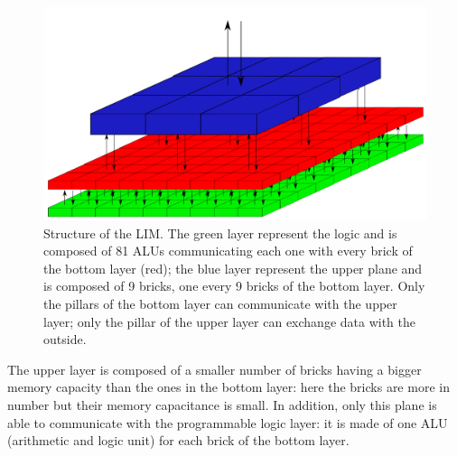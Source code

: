 \begin{figure}[h!]
	\centering
	\includegraphics[width=\textwidth]{imm/iia/B.png}  
	\caption{ Structure of the LIM. The green layer represent the logic and is composed of 81 ALUs communicating each one with every brick of the bottom layer (red); the blue layer represent the upper plane and is composed of 9 bricks, one every 9 bricks of the bottom layer. Only the pillars of the bottom layer can communicate with the upper layer; only the pillar of the upper layer can exchange data with the outside.
	} 
	\label{fig:B}
\end{figure}
The upper layer is composed of a smaller number of bricks having a bigger memory capacity than the ones in the bottom layer: here the bricks are more in number but their memory capacitance is small. In addition, only this plane is able to communicate with the programmable logic layer: it is made of one ALU (arithmetic and logic unit) for each brick of the bottom layer. 
\clearpage
